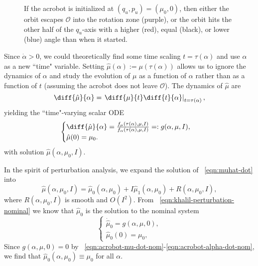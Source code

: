 \begin{figure}
    \centering 
    \caption{If the acrobot is initialized at \((q_u,p_u) = (\mu_0,0)\), then
        either the orbit escapes \(\mathcal{O}\) into the rotation
        zone (purple), or the orbit hits the other half of the \(q_u\)-axis 
        with a higher (red), equal (black), or lower (blue) angle than when it
        started.}
    \label{fig:acrobot-possible-orbits}
\end{figure}

Since \(\dot{\alpha} > 0\), we could theoretically find some time scaling 
\(t = \tau(\alpha)\) and use \(\alpha\) as a new ``time" variable.
Setting \(\hat{\mu}(\alpha) := \mu(\tau(\alpha))\) allows us to ignore the
dynamics of \(\alpha\) and study the evolution of \(\mu\) as a 
function of \(\alpha\) rather than as a function of \(t\) (assuming the acrobot
does not leave \(\mathcal{O}\)).
The dynamics of \(\hat{\mu}\) are
\[
    \diff{\hat{\mu}}{\alpha} = 
    \left.\diff{\mu}{t} \diff{t}{\alpha} \right|_{t =\tau(\alpha)}
    ,
\] 
yielding the ``time"-varying scalar ODE
\begin{equation}\label{eqn:muhat-dot}
    \begin{cases}
        \diff{\hat{\mu}}{\alpha} 
        = \frac{f_\mu(\tau(\alpha),\mu,I)}{f_\alpha(\tau(\alpha),\mu,I)}
        =: g(\alpha,\mu,I)
        , \\
        \hat{\mu}(0) = \mu_0
        .
    \end{cases}
\end{equation}
with solution \(\hat{\mu}(\alpha,\mu_0,I)\).

In the spirit of perturbation analysis, we expand the solution of
~\eqref{eqn:muhat-dot} into
\begin{equation}\label{eqn:acrobot-muhat-approx}
    \hat{\mu}(\alpha,\mu_0,I) = \hat{\mu}_0(\alpha,\mu_0) + I
    \hat{\mu}_1(\alpha,\mu_0)
    + R(\alpha,\mu_0,I)
    ,
\end{equation}
where \(R(\alpha,\mu_0,I)\) is smooth and \(O(I^2)\).
From ~\eqref{eqn:khalil-perturbation-nominal} we know that 
\(\hat{\mu}_0\) is the solution to the nominal system
\[
\begin{cases}
    \dot{\hat{\mu}}_0 = g(\alpha,\mu,0)
    , \\
    \hat{\mu}_0(0) = \mu_0
    ,
\end{cases}
\]
Since \(g(\alpha,\mu,0) = 0\) by 
~\eqref{eqn:acrobot-mu-dot-nom}-\eqref{eqn:acrobot-alpha-dot-nom}, we find that
\(\hat{\mu}_0(\alpha,\mu_0) \equiv \mu_0\) for all \(\alpha\).


